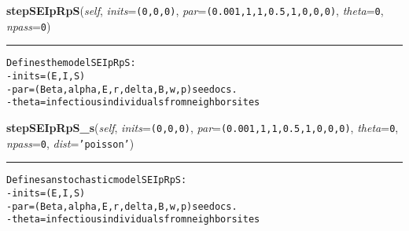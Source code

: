     \vspace{0.5ex}

    \begin{boxedminipage}{\textwidth}

    \raggedright \textbf{stepSEIpRpS}(\textit{self}, \textit{inits}=\texttt{(0,0,0)}, \textit{par}=\texttt{(0.001,1,1,0.5,1,0,0,0)}, \textit{theta}=\texttt{0}, \textit{npass}=\texttt{0})

    \vspace{-1.5ex}

    \rule{\textwidth}{0.5\fboxrule}
\begin{alltt}

Defines the model SEIpRpS:
- inits = (E,I,S)
- par = (Beta, alpha, E,r,delta,B,w,p) see docs.
- theta = infectious individuals from neighbor sites
\end{alltt}

    \vspace{1ex}

    \end{boxedminipage}

    \label{Epigrass:simobj:popmodels:stepSEIpRpS_s}

    \vspace{0.5ex}

    \begin{boxedminipage}{\textwidth}

    \raggedright \textbf{stepSEIpRpS\_s}(\textit{self}, \textit{inits}=\texttt{(0,0,0)}, \textit{par}=\texttt{(0.001,1,1,0.5,1,0,0,0)}, \textit{theta}=\texttt{0}, \textit{npass}=\texttt{0}, \textit{dist}=\texttt{'poisson'})

    \vspace{-1.5ex}

    \rule{\textwidth}{0.5\fboxrule}
\begin{alltt}

Defines an stochastic model SEIpRpS:
- inits = (E,I,S)
- par = (Beta, alpha, E,r,delta,B,w,p) see docs.
- theta = infectious individuals from neighbor sites
\end{alltt}

    \vspace{1ex}

    \end{boxedminipage}

    \label{Epigrass:simobj:popmodels:stepSIpR}


